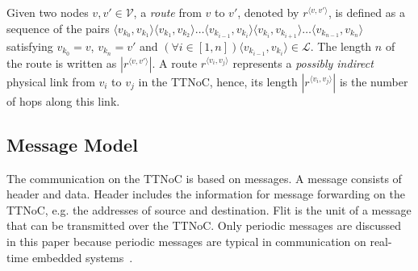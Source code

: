 \documentclass[10pt,journal]{IEEEtran}
\newcommand{\calV}{\mathcal{V}}
\newcommand{\calL}{\mathcal{L}}
\newcommand{\route}[3]{#1^{\langle #2,#3\rangle}}
\theoremstyle{remark}
\begin{document}

Given two nodes $v,v'\in\calV$, a \emph{route} from $v$ to $v'$,
 denoted by $\route{r}{v}{v'}$, is defined as a sequence of the pairs 
 $\langle v_{k_0},v_{k_1}\rangle\langle
v_{k_1},v_{k_2}\rangle\ldots\langle v_{k_{i-1}},v_{k_i}\rangle\langle
v_{k_i},v_{k_{i+1}}\rangle\ldots \langle v_{k_{n-1}},v_{k_n}\rangle$
satisfying $v_{k_0}=v$, $v_{k_n}=v'$ and $(\forall i\in [1,n])\langle
v_{k_{i-1}},v_{k_i}\rangle \in\calL$. The length $n$ of the route is
written as $|\route{r}{v}{v'}|$. A route $\route{r}{v_i}{v_j}$
represents a \emph{possibly indirect} physical link from $v_i$ to
$v_j$ in the TTNoC, hence, its length $|\route{r}{v_i}{v_j}|$ is the
number of hops along this link.



\subsection{Message Model}

The communication on the TTNoC is based on messages.  
A message consists of header and data.  
Header includes the information for message forwarding on the TTNoC,
 e.g. the addresses of source and destination. 
Flit is the unit of a message that can be transmitted over the TTNoC.  
Only periodic messages are discussed in this paper because periodic messages are typical in communication on real-time embedded systems~\cite{DBLP:conf/date/HuangBRBK12}.
\end{document}
